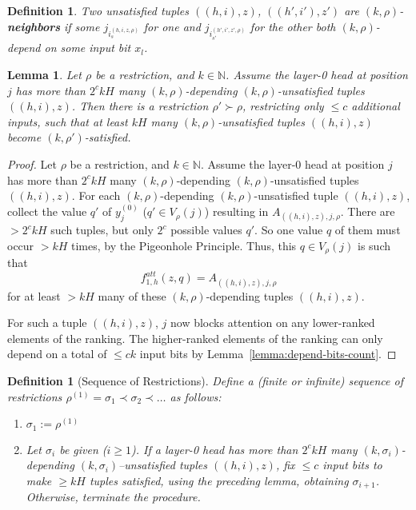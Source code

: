 \documentclass[11pt,letterpaper]{article}
\newcounter{theorem}
\newtheorem{defin}[theorem]{Definition}
\newtheorem{lemma}[theorem]{Lemma}
\begin{document}
\begin{defin}
Two unsatisfied tuples $((h,i),z)$, $((h',i'),z')$  are $(k,\rho)$-\textbf{neighbors} if some $j_{i_s^{(h,i,z,\rho)}}$ for one and $j_{i_{s'}^{(h',i',z',\rho)}}$ for the other both $(k,\rho)$-depend on some input bit $x_l$.
\end{defin}


\begin{lemma}
Let $\rho$ be a restriction, and $k \in \mathbb{N}$.
Assume the layer-0 head at position $j$ has more than $2^c kH$ many $(k,\rho)$-depending  $(k,\rho)$-unsatisfied tuples $((h,i),z)$.
Then there is a restriction $\rho' \succ \rho$, restricting only $\leq c$ additional inputs, such that at least $kH$ many $(k,\rho)$-unsatisfied tuples $((h,i),z)$ become $(k,\rho')$-satisfied.
\end{lemma}

\begin{proof}
Let $\rho$ be a restriction, and $k \in \mathbb{N}$.
Assume the layer-0 head at position $j$ has more than $2^c kH$ many $(k,\rho)$-depending  $(k,\rho)$-unsatisfied tuples $((h,i),z)$.
For each $(k,\rho)$-depending $(k,\rho)$-unsatisfied tuple $((h,i),z)$, collect the value $q'$ of $y_j^{(0)}$ ($q' \in V_\rho(j)$) resulting in $A_{((h,i),z),j,\rho}$.
There are $> 2^c kH$ such tuples, but only $2^c$ possible values $q'$. So one value $q$ of them must occur $> kH$ times, by the Pigeonhole Principle.
Thus, this $q \in V_\rho(j)$ is such that
\begin{equation}
    f^{att}_{1,h}(z, q) = A_{((h,i),z),j,\rho}
\end{equation}
for at least $> kH$ many of these $(k,\rho)$-depending tuples $((h,i),z)$.

For such a tuple $((h,i),z)$, $j$ now blocks attention on any lower-ranked elements of the ranking.
The higher-ranked elements of the ranking can only depend on a total of $\leq ck$ input bits by Lemma~\ref{lemma:depend-bits-count}.
\end{proof}




\begin{defin}[Sequence of Restrictions]
Define a (finite or infinite) sequence of restrictions $\rho^{(1)} = \sigma_1 \prec \sigma_2 \prec \dots$ as follows:
\begin{enumerate}
\item $\sigma_1 := \rho^{(1)}$
\item Let $\sigma_i$ be given ($i \geq 1$). If a layer-0 head has more than $2^c kH$ many $(k,\sigma_i)$-depending $(k,\sigma_i)$--unsatisfied tuples $((h,i),z)$, fix $\leq c$ input bits to make $\geq kH$ tuples satisfied, using the preceding lemma, obtaining $\sigma_{i+1}$.
Otherwise, terminate the procedure.
\end{enumerate}
\end{defin}
\end{document}
